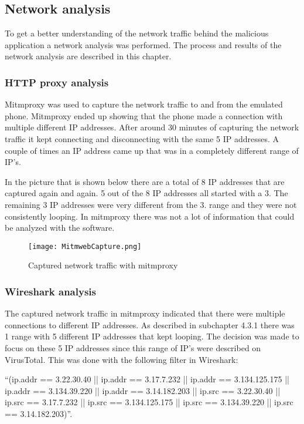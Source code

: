 \subsection{Network analysis}
To get a better understanding of the network traffic behind the malicious application a network analysis was performed.
The process and results of the network analysis are described in this chapter.

\subsubsection{HTTP proxy analysis}
Mitmproxy was used to capture the network traffic to and from the emulated phone.
Mitmproxy ended up showing that the phone made a connection with multiple different IP addresses.
After around 30 minutes of capturing the network traffic it kept connecting and disconnecting with the same 5 IP addresses.
A couple of times an IP address came up that was in a completely different range of IP’s.

In the picture that is shown below there are a total of 8 IP addresses that are captured again and again.
5 out of the 8 IP addresses all started with a 3.
The remaining 3 IP addresses were very different from the 3. range and they were not consistently looping.
In mitmproxy there was not a lot of information that could be analyzed with the software.

\begin{figure}[H]
    \centering
    \texttt{[image: MitmwebCapture.png]}
    \caption{Captured network traffic with mitmproxy}
    \label{jordy-mitmweb}
\end{figure}

\newpage
\subsubsection{Wireshark analysis}
The captured network traffic in mitmproxy indicated that there were multiple connections to different IP addresses.
As described in subchapter 4.3.1 there was 1 range with 5 different IP addresses that kept looping.
The decision was made to focus on these 5 IP addresses since this range of IP’s were described on VirusTotal.
This was done with the following filter in Wireshark:

“(ip.addr == 3.22.30.40 || ip.addr == 3.17.7.232 || ip.addr == 3.134.125.175 || ip.addr == 3.134.39.220 || ip.addr == 3.14.182.203 || ip.src == 3.22.30.40 || ip.src == 3.17.7.232 || ip.src == 3.134.125.175 || ip.src == 3.134.39.220 || ip.src == 3.14.182.203)”.
 
